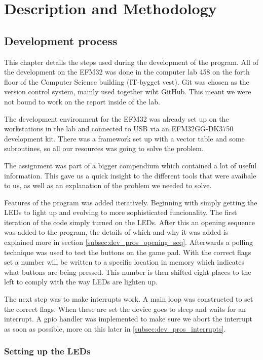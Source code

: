 \section{Description and Methodology}
\label{chap:description}

\subsection{Development process}
\label{subsec:development_process}

This chapter details the steps used during the development of the program. All of the development on the EFM32 was done in the computer lab 458 on the forth floor of the Computer Science building (IT-bygget vest). Git was chosen as the version control system, mainly used together wiht GitHub. This meant we were not bound to work on the report inside of the lab.

The development environment for the EFM32 was already set up on the workstations in the lab and connected to USB via an EFM32GG-DK3750 development kit. There was a framework set up with a vector table and some subroutines, so all our resources was going to solve the problem.

The assignment was part of a bigger compendium which contained a lot of useful information. This gave us a quick insight to the different tools that were avaibale to us, as well as an explanation of the problem we needed to solve.

Features of the program was added iteratively. Beginning with simply getting the LEDs to light up and evolving to more sophisticated funcionality. The first iteration of the code simply turned on the LEDs. After this an opening sequence was added to the program, the details of which and why it was added is explained more in section \ref{subsec:dev_pros_opening_seq}. Afterwards a polling technique was used to test the buttons on the game pad. With the correct flags set a number will be written to a specific location in memory which indicates what buttons are being pressed. This number is then shifted eight places to the left to comply with the way LEDs are lighten up.

The next step was to make interrupts work. A main loop was constructed to set the correct flags. When these are set the device goes to sleep and waits for an interrupt. A gpio handler was implemented to make sure we abort the interrupt as soon as possible, more on this later in \ref{subsec:dev_pros_interrupts}.

\subsubsection{Setting up the LEDs}
\label{subsec:dev_pros_setup_led}
